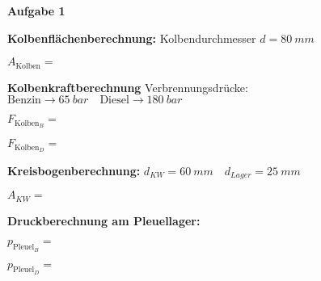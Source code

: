 \textbf{Aufgabe 1}

\textbf{Kolbenflächenberechnung:} Kolbendurchmesser $d = 80~mm$

$A_{\text{Kolben}} =$

\textbf{Kolbenkraftberechnung} Verbrennungsdrücke:
$\text{Benzin} \to 65~bar \quad \text{Diesel} \to 180~bar$

$F_{\text{Kolben}_{B}} =$

$F_{\text{Kolben}_{D}} =$

\textbf{Kreisbogenberechnung:}
$d_{KW} = 60~mm \quad d_{Lager} = 25~mm$

$A_{KW} =$

\textbf{Druckberechnung am Pleuellager:}

$p_{\text{Pleuel}_{B}} =$

$p_{\text{Pleuel}_{D}} =$
